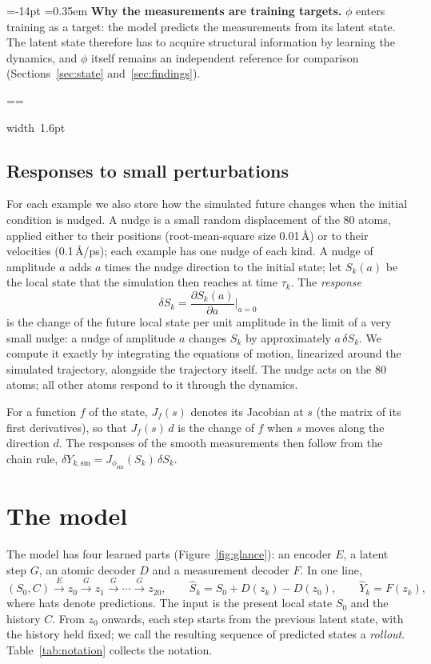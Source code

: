 \documentclass[11pt,a4paper]{article}
\makeatletter
\numberwithin{equation}{section}
\newcommand{\sm}{\mathrm{sm}}
\newcommand{\pcmWhyPiece}[1]{%
  \noindent\hbox{{\color{pcmAmber}\vrule width 1.6pt}%
    \setlength{\fboxsep}{7pt}\colorbox{pcmAmber!5}{\vbox{\unvbox#1}}}\par}
\newcommand{\pcmWhyEmit}{%
  \vbadness=10000
  \loop
    \par
    \ifdim\pagegoal=\maxdimen
      \pcmWhyAvail=\dimexpr\vsize-14pt\relax
    \else
      \pcmWhyAvail=\dimexpr\pagegoal-\pagetotal-19pt\relax
    \fi
    \ifdim\dimexpr\ht\pcmWhyAll+\dp\pcmWhyAll\relax>\pcmWhyAvail
      \ifdim\pcmWhyAvail<3\baselineskip
        \newpage
      \else
        \setbox\pcmWhyPart\vsplit\pcmWhyAll to \pcmWhyAvail
        \pcmWhyPiece\pcmWhyPart
      \fi
    \else
      \pcmWhyPiece\pcmWhyAll
    \fi
  \ifvoid\pcmWhyAll\else\repeat}
\newenvironment{why}[1][Why]{%
  \par\addvspace{.55em}%
  \setbox\pcmWhyAll\vbox\bgroup
    \hsize=\dimexpr\linewidth-1.6pt-14pt\relax
    \@parboxrestore\fussy
    \parskip=0.35em\relax
    \noindent\textcolor{pcmAmber}{\bfseries #1.}\enspace\ignorespaces}%
 {\par\egroup
  \splittopskip=\topskip\splitmaxdepth=\maxdepth
  \pcmWhyEmit
  \par\addvspace{.55em}}
\makeatother
\begin{document}
\begin{why}[Why the measurements are training targets]
$\phi$ enters training as a target: the model predicts the measurements from its
latent state. The latent state therefore has to acquire structural information
by learning the dynamics, and $\phi$ itself remains an independent reference for
comparison (Sections~\ref{sec:state} and~\ref{sec:findings}).
\end{why}

\subsection{Responses to small perturbations}
\label{sec:responses}

For each example we also store how the simulated future changes when the initial
condition is nudged. A nudge is a small random displacement of the 80 atoms,
applied either to their positions (root-mean-square size 0.01\,\AA) or to their
velocities (0.1\,\AA/ps); each example has one nudge of each kind. A nudge of
amplitude $a$ adds $a$ times the nudge direction to the initial state; let $S_k(a)$
be the local state that the simulation then reaches at time $\tau_k$. The
\emph{response}
\begin{equation}
\delta S_k=\frac{\partial S_k(a)}{\partial a}\bigg|_{a=0}
\end{equation}
is the change of the future local state per unit amplitude in the limit of a very
small nudge: a nudge of amplitude $a$ changes $S_k$ by approximately $a\,\delta S_k$.
We compute it exactly by integrating the equations of motion, linearized around the
simulated trajectory, alongside the trajectory itself. The nudge acts on the 80
atoms; all other atoms respond to it through the dynamics.

For a function $f$ of the state, $J_f(s)$ denotes its Jacobian at $s$ (the matrix
of its first derivatives), so that $J_f(s)\,d$ is the change of $f$ when $s$ moves
along the direction $d$. The responses of the smooth measurements then follow from
the chain rule, $\delta Y_{k,\sm}=J_{\phi_\sm}(S_k)\,\delta S_k$.

\section{The model}
\label{sec:model}

The model has four learned parts (Figure~\ref{fig:glance}): an encoder $E$, a
latent step $G$, an atomic decoder $D$ and a measurement decoder $F$. In one line,
\begin{equation}
(S_0,C)\xrightarrow{\;E\;}z_0\xrightarrow{\;G\;}z_1\xrightarrow{\;G\;}\cdots\xrightarrow{\;G\;}z_{20},
\qquad
\widehat S_k=S_0+D(z_k)-D(z_0),\qquad
\widehat Y_k=F(z_k),
\label{eq:model}
\end{equation}
where hats denote predictions. The input is the present local state $S_0$ and the
history $C$. From $z_0$ onwards, each step starts from the previous latent state,
with the history held fixed; we call the resulting sequence of predicted states a
\emph{rollout}. Table~\ref{tab:notation} collects the notation.
\end{document}
